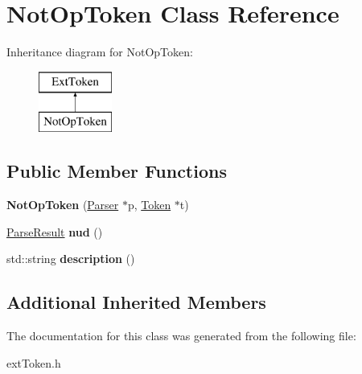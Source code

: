 \hypertarget{class_not_op_token}{}\section{Not\+Op\+Token Class Reference}
\label{class_not_op_token}
Inheritance diagram for Not\+Op\+Token\+:\begin{figure}[H]
\begin{center}
\leavevmode
\includegraphics[height=2.000000cm]{class_not_op_token}
\end{center}
\end{figure}
\subsection*{Public Member Functions}
\begin{DoxyCompactItemize}
\item 
\hypertarget{class_not_op_token_afb8b9e96a178b1dfd69abf0a901dfddf}{}{\bfseries Not\+Op\+Token} (\hyperlink{class_parser}{Parser} $\ast$p, \hyperlink{class_token}{Token} $\ast$t)\label{class_not_op_token_afb8b9e96a178b1dfd69abf0a901dfddf}

\item 
\hypertarget{class_not_op_token_a55a0dd53742aaca04338c16be079b031}{}\hyperlink{class_parse_result}{Parse\+Result} {\bfseries nud} ()\label{class_not_op_token_a55a0dd53742aaca04338c16be079b031}

\item 
\hypertarget{class_not_op_token_a136a11f1e42542a9a58b7c14249c9d23}{}std\+::string {\bfseries description} ()\label{class_not_op_token_a136a11f1e42542a9a58b7c14249c9d23}

\end{DoxyCompactItemize}
\subsection*{Additional Inherited Members}


The documentation for this class was generated from the following file\+:\begin{DoxyCompactItemize}
\item 
ext\+Token.\+h\end{DoxyCompactItemize}
